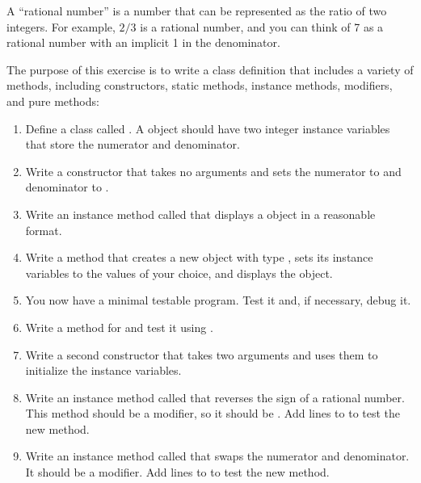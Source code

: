 \begin{exercise}  %


A ``rational number'' is a number that can be represented as the ratio of two integers.
For example, $2/3$ is a rational number, and you can think of 7 as a rational number with an implicit 1 in the denominator.

The purpose of this exercise is to write a class definition that includes a variety of methods, including constructors, static methods, instance methods, modifiers, and pure methods:

\begin{enumerate}

\item Define a class called .
A  object should have two integer instance variables that store the numerator and denominator.

\item Write a constructor that takes no arguments and sets the numerator to  and denominator to .

\item Write an instance method called  that displays a  object in a reasonable format.

\item Write a  method that creates a new object with type , sets its instance variables to the values of your choice, and displays the object.

\item You now have a minimal testable program.
Test it and, if necessary, debug it.

\item Write a  method for  and test it using .

\item Write a second constructor that takes two arguments and uses them to initialize the instance variables.

\item Write an instance method called  that reverses the sign of a rational number.
This method should be a modifier, so it should be .
Add lines to  to test the new method.

\item Write an instance method called  that swaps the numerator and denominator.
It should be a modifier.
Add lines to  to test the new method.


\end{enumerate}
\end{exercise}
